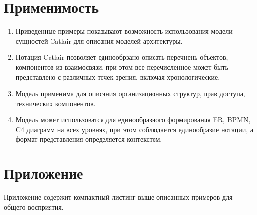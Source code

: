 \documentclass[final]{article}
\begin{document}
    \section{Применимость}

        \begin{enumerate}

            \item Приведенные примеры показывают возможность использования 
            модели сущностей Catlair для описания моделей архитектуры.

            \item Нотация Catlair позволяет единообрзано описать перечнень 
            объектов, компонентов из взаимосвязи, при этом все перечисленное 
            может быть представлено с различных точек зрения, включая 
            хронологические.

            \item Модель применима для описания организационных структур, прав 
            доступа, технических компонентов.

            \item Модель может использоватся для единообразного формирования ER, 
            BPMN, C4 диаграмм на всех уровнях, при этом соблюдается единообразие 
            нотации, а формат представления определяется контекстом.

        \end{enumerate}
        

    \section{Приложение}

        Приложение содержит компактный листинг выше описанных примеров для 
        общего восприятия.
\end{document}
